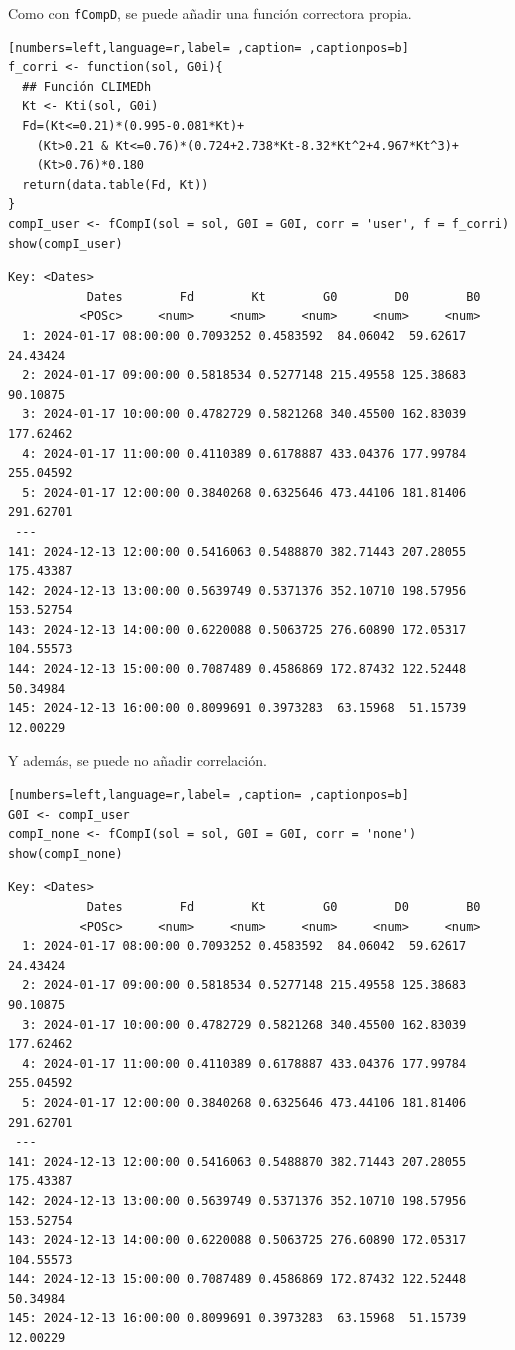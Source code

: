 \begin{itemize}
Como con \texttt{fCompD}, se puede añadir una función correctora propia.
\begin{lstlisting}[numbers=left,language=r,label= ,caption= ,captionpos=b]
f_corri <- function(sol, G0i){
  ## Función CLIMEDh
  Kt <- Kti(sol, G0i)
  Fd=(Kt<=0.21)*(0.995-0.081*Kt)+
    (Kt>0.21 & Kt<=0.76)*(0.724+2.738*Kt-8.32*Kt^2+4.967*Kt^3)+
    (Kt>0.76)*0.180
  return(data.table(Fd, Kt))
}
compI_user <- fCompI(sol = sol, G0I = G0I, corr = 'user', f = f_corri)
show(compI_user)
\end{lstlisting}

\begin{verbatim}
Key: <Dates>
		   Dates        Fd        Kt        G0        D0        B0
		  <POSc>     <num>     <num>     <num>     <num>     <num>
  1: 2024-01-17 08:00:00 0.7093252 0.4583592  84.06042  59.62617  24.43424
  2: 2024-01-17 09:00:00 0.5818534 0.5277148 215.49558 125.38683  90.10875
  3: 2024-01-17 10:00:00 0.4782729 0.5821268 340.45500 162.83039 177.62462
  4: 2024-01-17 11:00:00 0.4110389 0.6178887 433.04376 177.99784 255.04592
  5: 2024-01-17 12:00:00 0.3840268 0.6325646 473.44106 181.81406 291.62701
 ---                                                                      
141: 2024-12-13 12:00:00 0.5416063 0.5488870 382.71443 207.28055 175.43387
142: 2024-12-13 13:00:00 0.5639749 0.5371376 352.10710 198.57956 153.52754
143: 2024-12-13 14:00:00 0.6220088 0.5063725 276.60890 172.05317 104.55573
144: 2024-12-13 15:00:00 0.7087489 0.4586869 172.87432 122.52448  50.34984
145: 2024-12-13 16:00:00 0.8099691 0.3973283  63.15968  51.15739  12.00229
\end{verbatim}

Y además, se puede no añadir correlación.
\begin{lstlisting}[numbers=left,language=r,label= ,caption= ,captionpos=b]
G0I <- compI_user
compI_none <- fCompI(sol = sol, G0I = G0I, corr = 'none')
show(compI_none)
\end{lstlisting}

\begin{verbatim}
Key: <Dates>
		   Dates        Fd        Kt        G0        D0        B0
		  <POSc>     <num>     <num>     <num>     <num>     <num>
  1: 2024-01-17 08:00:00 0.7093252 0.4583592  84.06042  59.62617  24.43424
  2: 2024-01-17 09:00:00 0.5818534 0.5277148 215.49558 125.38683  90.10875
  3: 2024-01-17 10:00:00 0.4782729 0.5821268 340.45500 162.83039 177.62462
  4: 2024-01-17 11:00:00 0.4110389 0.6178887 433.04376 177.99784 255.04592
  5: 2024-01-17 12:00:00 0.3840268 0.6325646 473.44106 181.81406 291.62701
 ---                                                                      
141: 2024-12-13 12:00:00 0.5416063 0.5488870 382.71443 207.28055 175.43387
142: 2024-12-13 13:00:00 0.5639749 0.5371376 352.10710 198.57956 153.52754
143: 2024-12-13 14:00:00 0.6220088 0.5063725 276.60890 172.05317 104.55573
144: 2024-12-13 15:00:00 0.7087489 0.4586869 172.87432 122.52448  50.34984
145: 2024-12-13 16:00:00 0.8099691 0.3973283  63.15968  51.15739  12.00229
\end{verbatim}


\end{itemize}
